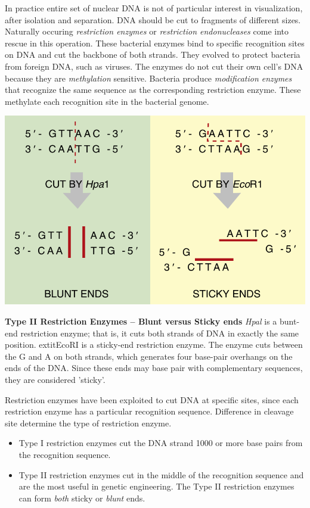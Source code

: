 \documentclass[nofonts,]{tufte-handout}
\providecommand{\tightlist}{%
  \setlength{\itemsep}{0pt}\setlength{\parskip}{0pt}}
\begin{document}
In practice entire set of nuclear DNA is not of particular interest in
visualization, after isolation and separation. DNA should be cut to
fragments of different sizes. Naturally occuring \emph{restriction
enzymes} or \emph{restriction endonucleases} come into rescue in this
operation. These bacterial enzymes bind to specific recognition sites on
DNA and cut the backbone of both strands. They evolved to protect
bacteria from foreign DNA, such as viruses. The enzymes do not cut their
own cell's DNA because they are \emph{methylation} sensitive. Bacteria
produce \emph{modification enzymes} that recognize the same sequence as
the corresponding restriction enzyme. These methylate each recognition
site in the bacterial genome.

\begin{marginfigure}
\includegraphics[width=0.95\linewidth]{./images/restriction_enzymes} \caption{\textbf{Type II Restriction Enzymes -- Blunt versus Sticky ends} \newline \textit{Hpal} is a bunt-end restriction enzyme; that is, it cuts both strands of DNA in exactly the same position.  extit{EcoR}I is a sticky-end restriction enzyme. The enzyme cuts between the G and A on both strands, which generates four base-pair overhangs on the ends of the DNA. Since these ends may base pair with complementary sequences, they are considered 'sticky'.}\label{fig:restriction-enzymes}
\end{marginfigure}

Restriction enzymes have been exploited to cut DNA at specific sites,
since each restriction enzyme has a particular recognition sequence.
Difference in cleavage site determine the type of restriction enzyme.

\begin{itemize}
\tightlist
\item
  Type I restriction enzymes cut the DNA strand 1000 or more base pairs
  from the recognition sequence.
\item
  Type II restriction enzymes cut in the middle of the recognition
  sequence and are the most useful in genetic engineering. The Type II
  restriction enzymes can form \emph{both} sticky or \emph{blunt} ends.
\end{itemize}
\end{document}
